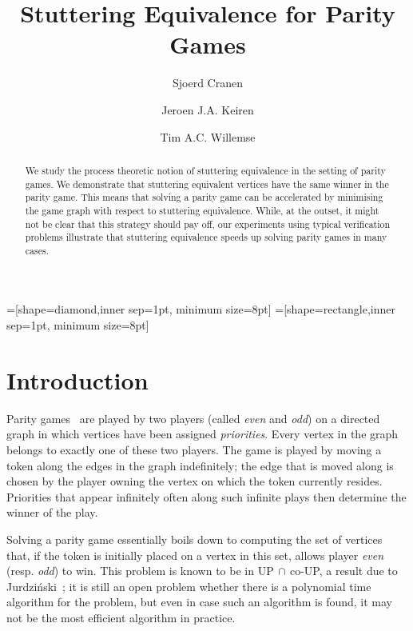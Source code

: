 \documentclass[a4paper]{llncs}
\begin{document}
=[shape=diamond,inner sep=1pt, minimum size=8pt]
=[shape=rectangle,inner sep=1pt, minimum size=8pt]  

\title{Stuttering Equivalence for Parity Games}
\author{Sjoerd Cranen \and Jeroen J.A. Keiren \and Tim A.C. Willemse}

\maketitle
\begin{abstract} We study the process theoretic notion of stuttering
equivalence in the setting of parity games. We demonstrate
that stuttering equivalent vertices have the same winner
in the parity game. This means that solving a parity game can be
accelerated by minimising the game graph with respect to stuttering
equivalence. While, at the outset, it might not be clear that this
strategy should pay off, our experiments using typical verification
problems illustrate that stuttering equivalence speeds up solving
parity games in many cases.

\end{abstract}


\section{Introduction}

Parity games~\cite{EJ:91,McN:93,Zie:98} are played by two players (called
\emph{even} and \emph{odd}) on a directed graph in which vertices have
been assigned \emph{priorities}.  Every vertex in the graph belongs to
exactly one of these two players. The game is played by moving a token
along the edges in the graph indefinitely; the edge that is moved along
is chosen by the player owning the vertex on which the token currently
resides. Priorities that appear infinitely often along such infinite
plays then determine the winner of the play.

Solving a parity game essentially boils down to computing the set of 
vertices that, if the token is initially placed on a vertex in this 
set, allows player \emph{even} (resp. \emph{odd}) to win. This problem 
is known to be in UP$\,\cap\,$co-UP, a result due to 
Jurdzi\'nski~\cite{Jur:98}; it is still an open problem whether there
is a polynomial time algorithm for the problem, but even in case
such an algorithm is found, it may not be the most efficient algorithm
in practice.
\end{document}
